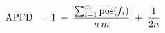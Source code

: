 \documentclass[preview]{standalone}
\begin{document}
\begin{align*}
\special{dvisvgm:raw <g id='unique000'>}\mathrm{APFD} \;=\; 1 \;-\; \dfrac{\sum_{i=1}^{m}\mathrm{pos}(f_i)}{n\,m} \;+\; \dfrac{1}{2n}\special{dvisvgm:raw </g>}
\end{align*}
\end{document}

